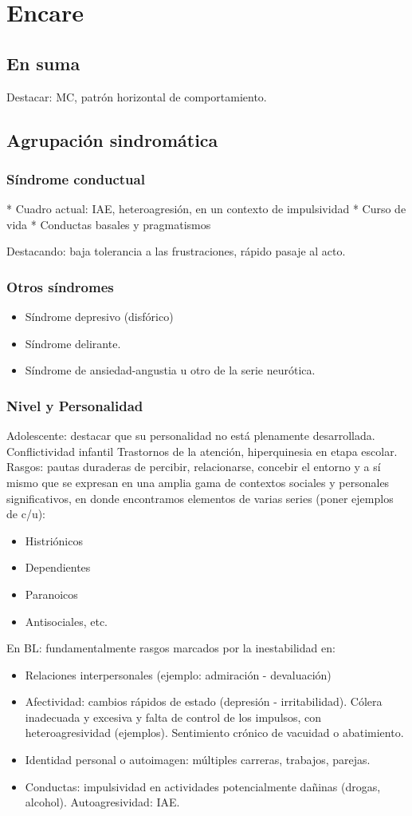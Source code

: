 \documentclass{scrbook}
\begin{document}
\section*{Encare}
\subsection*{En suma}
Destacar: MC, patrón horizontal de comportamiento.
\subsection*{Agrupación sindromática}
\subsubsection*{Síndrome conductual}
* Cuadro actual: IAE, heteroagresión, en un contexto de impulsividad
* Curso de vida
* Conductas basales y pragmatismos

Destacando: baja tolerancia a las frustraciones, rápido pasaje al acto.
\subsubsection*{Otros síndromes}
\begin{itemize}
    \item Síndrome depresivo (disfórico)
    \item Síndrome delirante.
    \item Síndrome de ansiedad-angustia u otro de la serie neurótica.
\end{itemize}
\subsubsection*{Nivel y Personalidad}
Adolescente: destacar que su personalidad no está plenamente desarrollada. Conflictividad infantil Trastornos de la atención, hiperquinesia en etapa escolar. Rasgos: pautas duraderas de percibir, relacionarse, concebir el entorno y a sí mismo que se expresan en una amplia gama de contextos sociales y personales significativos, en donde encontramos elementos de varias series (poner ejemplos de c/u):
\begin{itemize}
\item Histriónicos
\item Dependientes
\item Paranoicos
\item Antisociales, etc.
\end{itemize}
En BL: fundamentalmente rasgos marcados por la inestabilidad en:
\begin{itemize}
    \item Relaciones interpersonales (ejemplo: admiración - devaluación)
    \item Afectividad: cambios rápidos de estado (depresión - irritabilidad). Cólera inadecuada y excesiva y falta de control de los impulsos, con heteroagresividad (ejemplos). Sentimiento crónico de vacuidad o abatimiento.
    \item Identidad personal o autoimagen: múltiples carreras, trabajos, parejas.
    \item Conductas: impulsividad en actividades potencialmente dañinas (drogas, alcohol). Autoagresividad: IAE.
\end{itemize}
\end{document}

